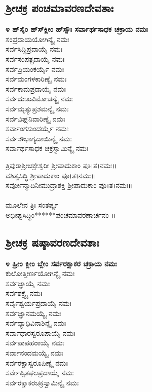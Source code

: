 \subsection{ಶ್ರೀಚಕ್ರ ಪಂಚಮಾವರಣದೇವತಾಃ}
{\bfseries ೪ ಹ್‌ಸೈಂ ಹ್‌ಸ್‌ಕ್ಲೀಂ ಹ್‌ಸ್ಸೌಃ ಸರ್ವಾರ್ಥಸಾಧಕ ಚಕ್ರಾಯ ನಮಃ}\\
ಸಂಪ್ರದಾಯಯೋಗಿನ್ಯೈ ನಮಃ\\
 ಸರ್ವಸಿದ್ಧಿಪ್ರದಾಯೈ ನಮಃ\\
 ಸರ್ವಸಂಪತ್ಪ್ರದಾಯೈ ನಮಃ\\
 ಸರ್ವಪ್ರಿಯಂಕರ್ಯೈ ನಮಃ\\
 ಸರ್ವಮಂಗಳಕಾರಿಣ್ಯೈ ನಮಃ\\
 ಸರ್ವಕಾಮಪ್ರದಾಯೈ ನಮಃ\\
 ಸರ್ವದುಃಖವಿಮೋಚನ್ಯೈ ನಮಃ\\
 ಸರ್ವಮೃತ್ಯುಪ್ರಶಮನ್ಯೈ ನಮಃ\\
 ಸರ್ವವಿಘ್ನನಿವಾರಿಣ್ಯೈ ನಮಃ\\
 ಸರ್ವಾಂಗಸುಂದರ್ಯೈ ನಮಃ\\
 ಸರ್ವಸೌಭಾಗ್ಯದಾಯಿನ್ಯೈ ನಮಃ\\
 ಸರ್ವಾರ್ಥಸಾಧಕ ಚಕ್ರಸ್ವಾಮಿನ್ಯೈ ನಮಃ

 ತ್ರಿಪುರಾಶ್ರೀಚಕ್ರೇಶ್ವರೀ ಶ್ರೀಪಾದುಕಾಂ ಪೂ।ತ।ನಮಃ॥\\
 ವಶಿತ್ವಸಿದ್ಧಿ ಶ್ರೀಪಾದುಕಾಂ ಪೂ।ತ।ನಮಃ॥\\
ಸರ್ವೋನ್ಮಾದಿನೀಮುದ್ರಾಶಕ್ತಿ ಶ್ರೀಪಾದುಕಾಂ ಪೂ।ತ।ನಮಃ॥\\
\\
ಮೂಲೇನ ತ್ರಿಃ ಸಂತರ್ಪ್ಯ\\
 ಅಭೀಷ್ಟಸಿದ್ಧಿಂ******ಪಂಚಮಾವರಣಾರ್ಚನಂ ॥
\subsection{ಶ್ರೀಚಕ್ರ ಷಷ್ಠಾವರಣದೇವತಾಃ}
{\bfseries ೪ ಹ್ರೀಂ ಕ್ಲೀಂ ಬ್ಲೇಂ ಸರ್ವರಕ್ಷಾಕರ ಚಕ್ರಾಯ ನಮಃ}\\
ಕುಲೋತ್ತೀರ್ಣಯೋಗಿನ್ಯೈ ನಮಃ\\
 ಸರ್ವಜ್ಞಾಯೈ ನಮಃ\\
 ಸರ್ವಶಕ್ತ್ಯೈ ನಮಃ\\
 ಸರ್ವೈಶ್ವರ್ಯಪ್ರದಾಯೈ ನಮಃ\\
 ಸರ್ವಜ್ಞಾನಮಯ್ಯೈ ನಮಃ\\
 ಸರ್ವವ್ಯಾಧಿವಿನಾಶಿನ್ಯೈ ನಮಃ\\
 ಸರ್ವಾಧಾರಸ್ವರೂಪಾಯೈ ನಮಃ\\
 ಸರ್ವಪಾಪಹರಾಯೈ ನಮಃ\\
 ಸರ್ವಾನಂದಮಯ್ಯೈ ನಮಃ\\
 ಸರ್ವರಕ್ಷಾಸ್ವರೂಪಿಣ್ಯೈ ನಮಃ\\
 ಸರ್ವೇಪ್ಸಿತಫಲಪ್ರದಾಯೈ ನಮಃ\\
 ಸರ್ವರಕ್ಷಾಕರಚಕ್ರಸ್ವಾಮಿನ್ಯೈ ನಮಃ

